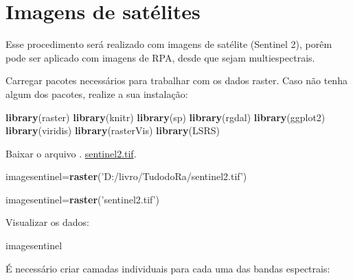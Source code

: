\documentclass[
]{book}
\newenvironment{Shaded}{\begin{snugshade}}{\end{snugshade}}
\newcommand{\KeywordTok}[1]{\textcolor[rgb]{0.13,0.29,0.53}{\textbf{#1}}}
\newcommand{\NormalTok}[1]{#1}
\newcommand{\StringTok}[1]{\textcolor[rgb]{0.31,0.60,0.02}{#1}}
\begin{document}
\hypertarget{imagens-de-satuxe9lites}{%
\section{Imagens de satélites}\label{imagens-de-satuxe9lites}}

Esse procedimento será realizado com imagens de satélite (Sentinel 2), porêm pode ser aplicado com imagens de RPA, desde que sejam multiespectrais.

Carregar pacotes necessários para trabalhar com os dados raster.
Caso não tenha algum dos pacotes, realize a sua instalação:

\begin{Shaded}
\begin{Highlighting}[]
\KeywordTok{library}\NormalTok{(raster)}
\KeywordTok{library}\NormalTok{(knitr)}
\KeywordTok{library}\NormalTok{(sp)}
\KeywordTok{library}\NormalTok{(rgdal)}
\KeywordTok{library}\NormalTok{(ggplot2)}
\KeywordTok{library}\NormalTok{(viridis)}
\KeywordTok{library}\NormalTok{(rasterVis)}
\KeywordTok{library}\NormalTok{(LSRS)}
\end{Highlighting}
\end{Shaded}

Baixar o arquivo . \href{https://www.dropbox.com/s/s08rizfs6wls9ml/sentinel2.tif?dl=1}{sentinel2.tif}.

\begin{Shaded}
\begin{Highlighting}[]
\NormalTok{imagesentinel=}\KeywordTok{raster}\NormalTok{(}\StringTok{'D:/livro/TudodoRa/sentinel2.tif'}\NormalTok{)}
\end{Highlighting}
\end{Shaded}

\begin{Shaded}
\begin{Highlighting}[]
\NormalTok{imagesentinel=}\KeywordTok{raster}\NormalTok{(}\StringTok{'sentinel2.tif'}\NormalTok{)}
\end{Highlighting}
\end{Shaded}

Visualizar os dados:

\begin{Shaded}
\begin{Highlighting}[]
\NormalTok{imagesentinel}
\end{Highlighting}
\end{Shaded}

É necessário criar camadas individuais para cada uma das bandas espectrais:
\end{document}
